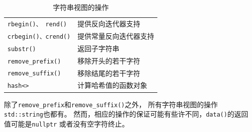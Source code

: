 \begin{table}[ht]
\begin{tabular}{l|l}
        \texttt{rbegin()、 rend()}          & 提供反向迭代器支持                          \\
        \texttt{crbegin()、crend()}         & 提供常量反向迭代器支持                        \\
        \texttt{substr()}                  & 返回子字符串                             \\
        \texttt{remove\_prefix()}          & 移除开头的若干字符                          \\
        \texttt{remove\_suffix()}          & 移除结尾的若干字符                          \\
        \texttt{hash<>}                    & 计算哈希值的函数对象                         \\
        \hline
    \end{tabular}
    \caption{字符串视图的操作}
    \label{t19.1}
\end{table}

除了\texttt{remove\_prefix}和\texttt{remove\_suffix()}之外，
所有字符串视图的操作\texttt{std::string}也都有。
然而，相应的操作的保证可能有些许不同，\texttt{data()}的返回值可能是\texttt{nullptr}
或者没有空字符终止。

